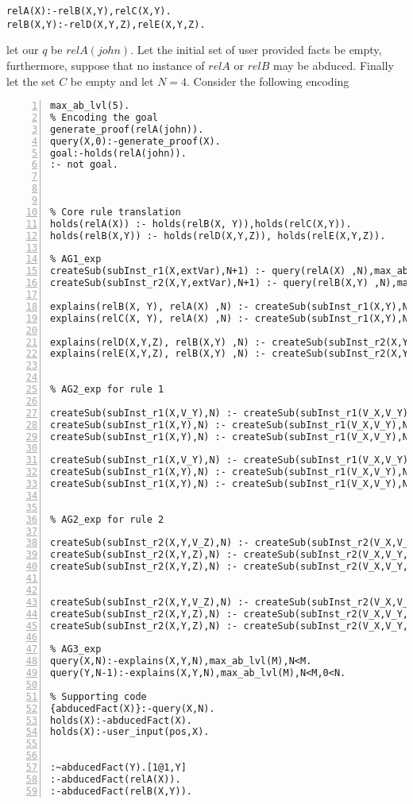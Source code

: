 \begin{lstlisting}[frame=none]
relA(X):-relB(X,Y),relC(X,Y).
relB(X,Y):-relD(X,Y,Z),relE(X,Y,Z).
\end{lstlisting}

let our $q$ be $relA(john)$. Let the initial set of user provided facts be empty, furthermore, suppose that no instance of $relA$ or $relB$ may be abduced. Finally let the set $C$ be empty and let $N=4$.  
Consider the following encoding
\begin{lstlisting}[numbers=left]
max_ab_lvl(5).
% Encoding the goal
generate_proof(relA(john)).
query(X,0):-generate_proof(X).
goal:-holds(relA(john)).
:- not goal.



% Core rule translation
holds(relA(X)) :- holds(relB(X, Y)),holds(relC(X,Y)).
holds(relB(X,Y)) :- holds(relD(X,Y,Z)), holds(relE(X,Y,Z)).

% AG1_exp
createSub(subInst_r1(X,extVar),N+1) :- query(relA(X) ,N),max_ab_lvl(M),N<M-1.
createSub(subInst_r2(X,Y,extVar),N+1) :- query(relB(X,Y) ,N),max_ab_lvl(M),N<M-1.

explains(relB(X, Y), relA(X) ,N) :- createSub(subInst_r1(X,Y),N).
explains(relC(X, Y), relA(X) ,N) :- createSub(subInst_r1(X,Y),N).

explains(relD(X,Y,Z), relB(X,Y) ,N) :- createSub(subInst_r2(X,Y,Z),N).
explains(relE(X,Y,Z), relB(X,Y) ,N) :- createSub(subInst_r2(X,Y,Z),N).


% AG2_exp for rule 1

createSub(subInst_r1(X,V_Y),N) :- createSub(subInst_r1(V_X,V_Y),N), holds(relA(X)).
createSub(subInst_r1(X,Y),N) :- createSub(subInst_r1(V_X,V_Y),N), holds(relB(X,Y)).
createSub(subInst_r1(X,Y),N) :- createSub(subInst_r1(V_X,V_Y),N), holds(relC(X,Y)).

createSub(subInst_r1(X,V_Y),N) :- createSub(subInst_r1(V_X,V_Y),N), query(relA(X),L).
createSub(subInst_r1(X,Y),N) :- createSub(subInst_r1(V_X,V_Y),N), query(relB(X,Y),L).
createSub(subInst_r1(X,Y),N) :- createSub(subInst_r1(V_X,V_Y),N), query(relC(X,Y),L).


% AG2_exp for rule 2

createSub(subInst_r2(X,Y,V_Z),N) :- createSub(subInst_r2(V_X,V_Y,V_Z),N), holds(relB(X,Y)).
createSub(subInst_r2(X,Y,Z),N) :- createSub(subInst_r2(V_X,V_Y,V_Z),N), holds(relD(X,Y,Z)).
createSub(subInst_r2(X,Y,Z),N) :- createSub(subInst_r2(V_X,V_Y,V_Z),N), holds(relE(X,Y,Z)).


createSub(subInst_r2(X,Y,V_Z),N) :- createSub(subInst_r2(V_X,V_Y,V_Z),N), query(relB(X,Y),L).
createSub(subInst_r2(X,Y,Z),N) :- createSub(subInst_r2(V_X,V_Y,V_Z),N), query(relD(X,Y,Z),L).
createSub(subInst_r2(X,Y,Z),N) :- createSub(subInst_r2(V_X,V_Y,V_Z),N), query(relE(X,Y,Z),L).

% AG3_exp
query(X,N):-explains(X,Y,N),max_ab_lvl(M),N<M.
query(Y,N-1):-explains(X,Y,N),max_ab_lvl(M),N<M,0<N.

% Supporting code
{abducedFact(X)}:-query(X,N).
holds(X):-abducedFact(X).
holds(X):-user_input(pos,X).


:~abducedFact(Y).[1@1,Y]
:-abducedFact(relA(X)).
:-abducedFact(relB(X,Y)).

\end{lstlisting}

